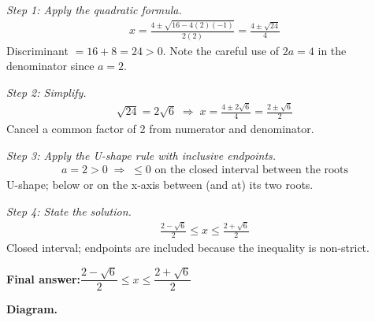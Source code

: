 \documentclass[11pt]{article}
\begin{document}
\textit{Step 1: Apply the quadratic formula.}
\[\begin{gathered}
x = \frac{4 \pm \sqrt{16 - 4(2)(-1)}}{2(2)} = \frac{4 \pm \sqrt{24}}{4}
\end{gathered}\]
Discriminant \( = 16 + 8 = 24 > 0 \). Note the careful use of \( 2a = 4 \) in the denominator since \( a = 2 \).

\textit{Step 2: Simplify.}
\[\begin{gathered}
\sqrt{24} = 2\sqrt{6} \;\Longrightarrow\; x = \frac{4 \pm 2\sqrt{6}}{4} = \frac{2 \pm \sqrt{6}}{2}
\end{gathered}\]
Cancel a common factor of 2 from numerator and denominator.

\textit{Step 3: Apply the U-shape rule with inclusive endpoints.}
\[\begin{gathered}
a = 2 > 0 \;\Longrightarrow\; \leq 0 \text{ on the closed interval between the roots}
\end{gathered}\]
U-shape; below or on the x-axis between (and at) its two roots.

\textit{Step 4: State the solution.}
\[\begin{gathered}
\frac{2 - \sqrt{6}}{2} \leq x \leq \frac{2 + \sqrt{6}}{2}
\end{gathered}\]
Closed interval; endpoints are included because the inequality is non-strict.

\begin{answerbox}
\textbf{Final answer:}\quad \(\displaystyle \dfrac{2 - \sqrt{6}}{2} \leq x \leq \dfrac{2 + \sqrt{6}}{2}\)
\end{answerbox}
\textbf{Diagram.}
\end{document}
